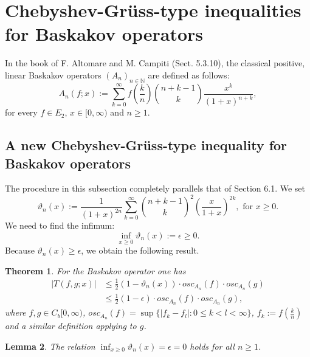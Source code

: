 \documentclass[12pt,leqno,a4paper,dvips,twoside]{article}
\newcommand*{\N}{\ensuremath{\mathbb{N}}}               %
\newtheorem{thm}{Theorem}[section]
\newtheorem{lema}[thm]{Lemma}%
\begin{document}
{\section{Chebyshev-Gr\"{u}ss-type inequalities for Baskakov operators}

In the book of F. Altomare and M. Campiti \cite{altomare:1994} (Sect. 5.3.10), the classical positive, linear Baskakov operators $(A_n)_{n\in\N}$ are defined as follows:
	\begin{equation*}
		A_n(f;x):=\sum^{\infty}_{k=0}{f\left(\frac{k}{n}\right)\binom{n+k-1}{k}\frac{x^k}{(1+x)^{n+k}}},
	\end{equation*}
for every $f\in E_2$, $x\in [0,\infty)$ and $n\geq 1$. 

\subsection{A new Chebyshev-Gr\"{u}ss-type inequality for Baskakov operators}
The procedure in this subsection completely parallels that of Section 6.1.
We set 
	\begin{equation*}
		\vartheta_n(x):=\frac{1}{(1+x)^{2n}}\sum^{\infty}_{k=0}{\binom{n+k-1}{k}^2\left(\frac{x}{1+x}\right)^{2k}},\text{ for }x\geq 0.
	\end{equation*}
We need to find the infimum:
	\begin{equation*}	
	\inf_{x\geq 0}\vartheta_n(x):=\epsilon\geq 0.
	\end{equation*}
Because $\vartheta_n(x)\geq \epsilon$, we obtain the following result.

\begin{thm}
	For the Baskakov operator one has
	\begin{align*}
		\left|T(f,g;x)\right|&\leq \frac{1}{2}\left(1-\vartheta_n(x)\right)\cdot osc_{A_n}(f)\cdot osc_{A_n}(g)\\
		&\leq \frac{1}{2}(1-\epsilon)\cdot osc_{A_n}(f)\cdot osc_{A_n}(g),
	\end{align*}	
where $f,g\in C_b[0,\infty)$, $osc_{A_n}(f)=\sup\{\left|f_k-f_l\right|:0\leq k<l<\infty\}$, $f_k:=f\left(\frac{k}{n}\right)$ and a similar definition applying to $g$. 	
\end{thm}

\begin{lema} 
	The relation 
		$\inf_{x\geq 0}\vartheta_n(x)=\epsilon=0$
	holds for all $n\geq 1$. 
\end{lema}

}
\end{document}
